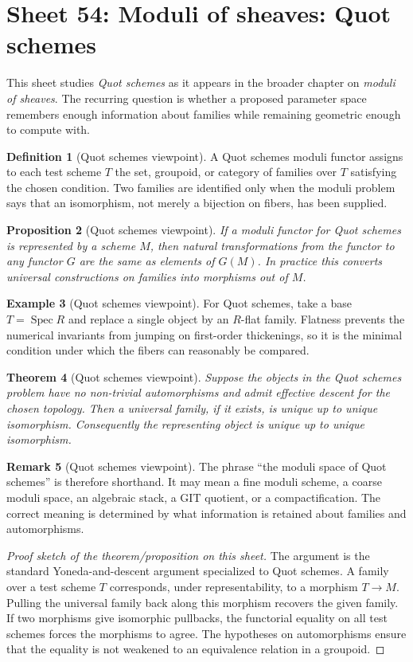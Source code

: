 \documentclass[11pt]{amsart}
\newtheorem{theorem}{Theorem}[section]
\newtheorem{proposition}[theorem]{Proposition}
\theoremstyle{definition}
\newtheorem{definition}[theorem]{Definition}
\newtheorem{example}[theorem]{Example}
\newtheorem{remark}[theorem]{Remark}
\newcommand{\Spec}{\operatorname{Spec}}
\begin{document}
\section{Sheet 54: Moduli of sheaves: Quot schemes}
This sheet studies \emph{Quot schemes} as it appears in the broader chapter on \emph{moduli of sheaves}.  The recurring question is whether a proposed parameter space remembers enough information about families while remaining geometric enough to compute with.
\begin{definition}[Quot schemes viewpoint]
A Quot schemes moduli functor assigns to each test scheme $T$ the set, groupoid, or category of families over $T$ satisfying the chosen condition.  Two families are identified only when the moduli problem says that an isomorphism, not merely a bijection on fibers, has been supplied.
\end{definition}
\begin{proposition}[Quot schemes viewpoint]
If a moduli functor for Quot schemes is represented by a scheme $M$, then natural transformations from the functor to any functor $G$ are the same as elements of $G(M)$.  In practice this converts universal constructions on families into morphisms out of $M$.
\end{proposition}
\begin{example}[Quot schemes viewpoint]
For Quot schemes, take a base $T=\Spec R$ and replace a single object by an $R$-flat family.  Flatness prevents the numerical invariants from jumping on first-order thickenings, so it is the minimal condition under which the fibers can reasonably be compared.
\end{example}
\begin{theorem}[Quot schemes viewpoint]
Suppose the objects in the Quot schemes problem have no non-trivial automorphisms and admit effective descent for the chosen topology.  Then a universal family, if it exists, is unique up to unique isomorphism.  Consequently the representing object is unique up to unique isomorphism.
\end{theorem}
\begin{remark}[Quot schemes viewpoint]
The phrase ``the moduli space of Quot schemes'' is therefore shorthand.  It may mean a fine moduli scheme, a coarse moduli space, an algebraic stack, a GIT quotient, or a compactification.  The correct meaning is determined by what information is retained about families and automorphisms.
\end{remark}
\begin{proof}[Proof sketch of the theorem/proposition on this sheet]
The argument is the standard Yoneda-and-descent argument specialized to Quot schemes.  A family over a test scheme $T$ corresponds, under representability, to a morphism $T\to M$.  Pulling the universal family back along this morphism recovers the given family.  If two morphisms give isomorphic pullbacks, the functorial equality on all test schemes forces the morphisms to agree.  The hypotheses on automorphisms ensure that the equality is not weakened to an equivalence relation in a groupoid.
\end{proof}
\end{document}
